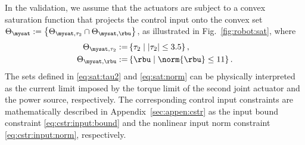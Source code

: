 \documentclass[journal]{IEEEtran}
\begin{document}
In the validation, we assume that the actuators are subject to a convex saturation function that projects the control input onto the convex set 
$
    \Theta_{\mysat} :=\left\{ \Theta_{\mysat, {\tau_2}} \cap \Theta_{\mysat, {\rbu}} \right\}
$, as illustrated in Fig.~\ref{fig:robot:sat}, where
\begin{subequations}
    \begin{align}
        \Theta_{\mysat, {\tau_2}}
        :=&
        \left\{
            \tau_2
            \mid
            \vert{\tau_2}\vert \le 
            3.5
        \right\}
        ,
        \label{eq:sat:tau2}
        \\    
        \Theta_{\mysat, {\rbu}}
        :=&
        \left\{
            \rbu
            \mid
            \norm{\rbu} \le 
            11
        \right\}
        .
        \label{eq:sat:norm}
    \end{align}
    \label{eq:sat}%
\end{subequations}
The sets defined in \eqref{eq:sat:tau2} and \eqref{eq:sat:norm} can be physically interpreted as the current limit imposed by the torque limit of the second joint actuator and the power source, respectively.
The corresponding control input constraints are mathematically described in Appendix~\ref{sec:appen:cstr} as the input bound constraint \eqref{eq:cstr:input:bound} and the nonlinear input norm constraint \eqref{eq:cstr:input:norm}, respectively.
\end{document}
